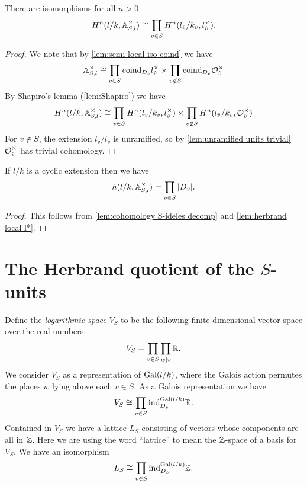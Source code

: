 \begin{lemma} \label{lem:cohomology S-ideles decomp}
	There are isomorphisms for all $n > 0$
	\[
		H^n(l/k, {\mathbb A}_{S,l}^\times)
		\cong
		\prod_{v \in S} H^n(l_{\hat v} / k_v, l_{\hat v}^\times).
	\]
\end{lemma}

\begin{proof}
	We note that by \ref{lem:semi-local iso coind} we have
	\[
		{\mathbb A}_{S,l}^\times \cong \prod_{v \in S} \mathrm{coind}_{D_{\hat v}} l_{\hat v}^\times
		\times
		\prod_{v \not\in S} \mathrm{coind}_{D_{\hat v}} {\mathcal O}_{\hat v}^\times
	\]
	By Shapiro's lemma (\ref{lem:Shapiro}) we have
	\[
		H^n(l/k,{\mathbb A}_{S,l}^\times) \cong
		\prod_{v \in S} H^n(l_{\hat v}/k_v , l_{\hat v}^\times)
		\times
		\prod_{v \not\in S} H^n(l_{\hat v}/k_v , {\mathcal O}_{\hat v}^\times)
	\]
	For $v \not\in S$, the extension $l_{\hat{v}}/l_v$ is unramified, so
	by \ref{lem:unramified units trivial} ${\mathcal O}_{\hat v}^\times$ has trivial cohomology.
\end{proof}


\begin{lemma} \label{lem:herbrand S-ideles}
	If $l/k$ is a cyclic extension then we have
	\[
		h(l/k, {\mathbb A}_{S,l} ^\times )
		=
		\prod_{v \in S} |D_{\hat v}|.
	\]
\end{lemma}

\begin{proof}
	This follows from \ref{lem:cohomology S-ideles decomp} and
	\ref{lem:herbrand local l*}.
\end{proof}





\section{The Herbrand quotient of the $S$-units}

Define the \emph{logarithmic space} $V_S$ to be the following finite dimensional vector space
over the real numbers:
\[
	V_S = \prod_{v \in S} \prod_{w | v} {\mathbb R}.
\]
We consider $V_S$ as a representation of $\mathrm{Gal}(l/k)$, where the Galois action
permutes the places $w$ lying above each $v \in S$.
As a Galois representation we have
\[
	V_S \cong \prod_{v \in S} \mathrm{ind}_{D_{\hat v}}^{\mathrm{Gal}(l/k)} {\mathbb R}.
\]
Contained in $V_S$ we have a lattice $L_S$ consisting of vectors whose components are all in ${\mathbb Z}$.
Here we are using the word ``lattice'' to mean the ${\mathbb Z}$-space of a basis for $V_S$.
We have an isomorphism
\[
	L_S \cong \prod_{v \in S} \mathrm{ind}_{D_{\hat v}}^{\mathrm{Gal}(l/k)} {\mathbb Z}.
\]

